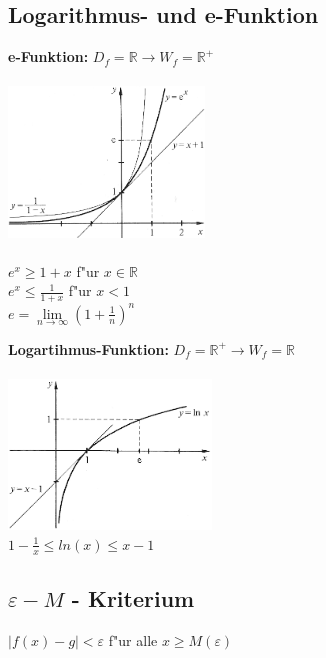 \begin{flushleft}
		\subsection{Logarithmus- und e-Funktion}
			\begin{minipage}[c]{9cm}
				\textbf{e-Funktion:} 
				$D_f=\mathbb{R} \rightarrow W_f=\mathbb{R}^+$ \\ \\
				\includegraphics[height=4cm]{./bilder/funktionen_e.png} \\ \\
				$e^x \geq 1+x$ f"ur $x \in \mathbb{R}$\\
				$e^x \leq \frac{1}{1+x}$ f"ur $x < 1$\\
				$e=\lim\limits_{n\rightarrow\infty}(1+\frac{1}{n})^n$\\
			\end{minipage}
			\begin{minipage}[c]{9cm}
				\textbf{Logartihmus-Funktion:} $D_f=\mathbb{R}^+ \rightarrow W_f=\mathbb{R}$ \\ \\
				\includegraphics[height=4cm]{./bilder/funktionen_ln.png}\\
				$1-\frac{1}{x} \leq ln(x) \leq x-1$
			\end{minipage}
	
		\subsection{$\varepsilon - M$ - Kriterium}
			$|f(x) - g| < \varepsilon$ f"ur alle $x \geq M(\varepsilon)$


\end{flushleft}
